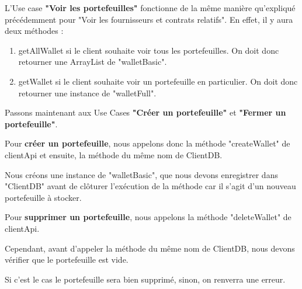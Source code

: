 \newpage
\begin{flushleft}
L'Use case \textbf{"Voir les portefeuilles"} fonctionne de la même manière qu'expliqué précédemment pour "Voir les fournisseurs et contrats relatifs".
En effet, il y aura deux méthodes : 
\end{flushleft}
\begin{enumerate}
\item getAllWallet si le client souhaite voir tous les portefeuilles. On doit donc retourner une ArrayList de "walletBasic".
\item getWallet si le client souhaite voir un portefeuille en particulier. On doit donc retourner une instance de "walletFull".
\end{enumerate}

\begin{flushleft}
Passons maintenant aux Use Cases \textbf{"Créer un portefeuille"} et \textbf{"Fermer un portefeuille"}.
\end{flushleft}

\begin{flushleft}
Pour \textbf{créer un portefeuille}, nous appelons donc la méthode "createWallet" de clientApi et ensuite, la méthode du même nom de ClientDB.
\end{flushleft}

\begin{flushleft}
Nous créons une instance de "walletBasic", que nous devons enregistrer dans "ClientDB" avant de clôturer l'exécution de la méthode car il s'agit d'un nouveau portefeuille à stocker.
\end{flushleft}

\begin{flushleft}
Pour \textbf{supprimer un portefeuille}, nous appelons la méthode "deleteWallet" de clientApi.
\end{flushleft}
\begin{flushleft}
Cependant, avant d'appeler la méthode du même nom de ClientDB, nous devons vérifier que le portefeuille est vide.
\end{flushleft}
\begin{flushleft}
Si c'est le cas le portefeuille sera bien supprimé, sinon, on renverra une erreur.
\end{flushleft}

